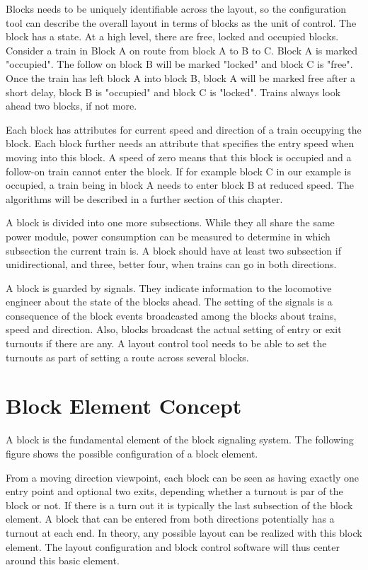 Blocks needs to be uniquely identifiable across the layout, so the configuration tool can describe the overall layout in terms of blocks as the unit of control. The block has a state. At a high level, there are free, locked and occupied blocks. Consider a train in Block A on route from block A to B to C. Block A is marked "occupied". The follow on block B will be marked "locked" and block C is "free". Once the train has left block A into block B, block A will be marked free after a short delay, block B is "occupied" and block C is "locked". Trains always look ahead two blocks, if not more.

Each block has attributes for current speed and direction of a train occupying the block. Each block further needs an attribute that specifies the entry speed when moving into this block. A speed of zero means that this block is occupied and a follow-on train cannot enter the block. If for example block C in our example is occupied, a train being in block A needs to enter block B at reduced speed. The algorithms will be described in a further section of this chapter.

A block is divided into one more subsections. While they all share the same power module, power consumption can be measured to determine in which subsection the current train is. A block should have at least two subsection if unidirectional, and three, better four, when trains can go in both directions.

A block is guarded by signals. They indicate information to the locomotive engineer about the state of the blocks ahead. The setting of the signals is a consequence of the block events broadcasted among the blocks about trains, speed and direction. Also, blocks broadcast the actual setting of entry or exit turnouts if there are any. A layout control tool needs to be able to set the turnouts as part of setting a route across several blocks.

\section{Block Element Concept}

A block is the fundamental element of the block signaling system. The following figure shows the possible configuration of a block  element.


From a moving direction viewpoint, each block can be seen as having exactly one entry point and optional two exits, depending whether a turnout is par of the block or not. If there is a turn out it is typically the last subsection of the block element. A block that can be entered from both directions potentially has a turnout at each end. In theory, any possible layout can be realized with this block element. The layout configuration and block control software will thus center around this basic element.

